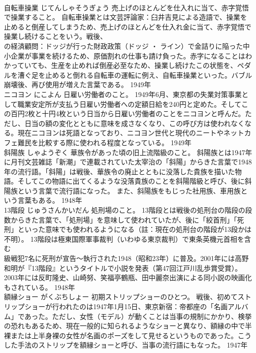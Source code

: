\documentclass[8pt]{extreport}
\begin{document}
\begin{CJK}{UTF8}{min}
\\	自転車操業	じてんしゃそうぎょう	売上げのほとんどを仕入れに当て、赤字覚悟で操業すること。	自転車操業とは文芸評論家：臼井吉見による造語で、操業を止めると倒産してしまうため、売上げのほとんどを仕入れ金に当て、赤字覚悟で操業し続けることをいう。戦後、
\\	の経済顧問：ドッジが行った財政政策（ドッジ ・ ライン）で金詰りに陥った中小企業が事業を続けるため、原価割れの仕事も請け負った。赤字になることはわかっていても、生産を止めれば倒産必至なため、操業し続けたこの状態を、ペダルを漕ぐ足を止めると倒れる自転車の運転に例え、自転車操業といった。バブル崩壊後、再び使用が増えた言葉である。	1949年	
\\	ニコヨン	にこよん	日雇い労働者のこと。	1949年6月、東京都の失業対策事業として職業安定所が支払う日雇い労働者への定額日給を240円と定めた。そしてこの百円2枚と十円4枚という日当から日雇い労働者のことをニコヨンと呼んだ。ただし、日当の額の変化とともに意味を成さなくなり、この呼び方は使われなくなる。現在ニコヨンは死語となっており、ニコヨン世代と現代のニートやネットカフェ難民を比較する際に使われる程度となっている。	1949年	
\\	斜陽族	しゃようぞく	華族令があった頃の旧上流階級のこと。	斜陽族とは1947年に月刊文芸雑誌「新潮」で連載されていた太宰治の「斜陽」からきた言葉で1948年の流行語。「斜陽」は戦後、華族令の廃止とともに没落した貴族を描いた物語。そしてこの物語に出てくるような没落貴族のことを斜陽階級と呼び、後に斜陽族という言葉で流行語になった。 また、斜陽族をもじった社用族、車用族という言葉もある。	1948年	
\\	13階段	じゅうさんかいだん	処刑場のこと。	13階段とは戦後の処刑台の階段の段数からきた言葉で、「処刑場」を意味して使われていたが、後に「絞首刑」「死刑」といった意味でも使われるようになる（註：現在の処刑台の階段が13段かは不明）。 13階段は極東国際軍事裁判（いわゆる東京裁判）で東条英機元首相を含む
\\	級戦犯7名に死刑が宣告～執行された1948（昭和23年）に普及。2001年には高野和明が『13階段』というタイトルで小説を発表（第47回江戸川乱歩賞受賞）。2003年には反町隆史、山崎努、笑福亭鶴瓶、田中麗奈出演による同小説の映画化もされている。	1948年	
\\	額縁ショー	がくぶちしょー	初期ストリップショーのひとつ。	戦後、初めてストリップショーが行われたのは1947年1月15日、東京新宿：帝都座の「名画アルバム」であった。ただし、女性（モデル）が動くことは当事の規制にかかり、検挙の恐れもあるため、現在一般的に知られるようなショーと異なり、額縁の中で半裸または上半身裸の女性が名画のポーズをして見せるというものであった。こうした手法のストリップを額縁ショーと呼び、当事の流行語にもなった。	1947年	

\end{CJK}
\end{document}

